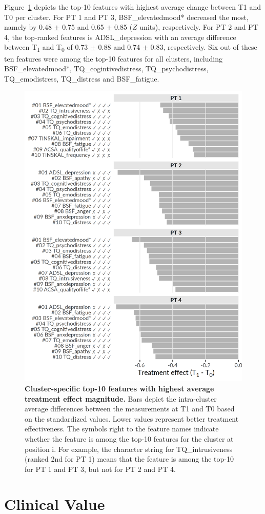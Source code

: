 \documentclass[
  oneside]{book}
\begin{document}
Figure~\ref{fig:06-treatment-effects} depicts the top-10 features with highest average change between T1 and T0 per cluster.
For PT 1 and PT 3, BSF\_elevatedmood* decreased the most, namely by 0.48 \(\pm\) 0.75 and 0.65 \(\pm\) 0.85 (\(Z\) units), respectively.
For PT 2 and PT 4, the top-ranked features is ADSL\_depression with an average difference between T\textsubscript{1} and T\textsubscript{0} of 0.73 \(\pm\) 0.88 and 0.74 \(\pm\) 0.83, respectively.
Six out of these ten features were among the top-10 features for all clusters, including BSF\_elevatedmood*, TQ\_cogintivedistress, TQ\_psychodistress, TQ\_emodistress, TQ\_distress and BSF\_fatigue.



\begin{figure}

{\centering \includegraphics[width=0.5\linewidth]{figures/06-treatment-effects} 

}

\caption{\textbf{Cluster-specific top-10 features with highest average treatment effect magnitude.} Bars depict the intra-cluster average differences between the measurements at T1 and T0 based on the standardized values. Lower values represent better treatment effectiveness. The symbols right to the feature names indicate whether the feature is among the top-10 features for the cluster at position i. For example, the character string     for TQ\_intrusiveness (ranked 2nd for PT 1) means that the feature is among the top-10 for PT 1 and PT 3, but not for PT 2 and PT 4.}\label{fig:06-treatment-effects}
\end{figure}

\hypertarget{phenotypes-clinical-interpretation}{%
\section{Clinical Value}\label{phenotypes-clinical-interpretation}}
\end{document}
